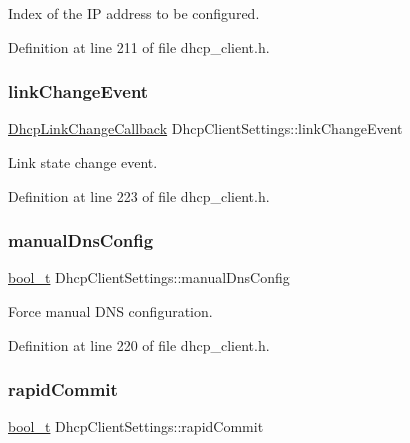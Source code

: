 Index of the IP address to be configured. 



Definition at line 211 of file dhcp\+\_\+client.\+h.

\mbox{\label{structDhcpClientSettings_a4bdc4bcc6332d448cee3df568ce7b514}} 
\subsubsection{\texorpdfstring{link\+Change\+Event}{linkChangeEvent}}
{\footnotesize\ttfamily \hyperlink{dhcp__client_8h_a008d4a3a83cb2d68f003bd9668f7e2c7}{Dhcp\+Link\+Change\+Callback} Dhcp\+Client\+Settings\+::link\+Change\+Event}



Link state change event. 



Definition at line 223 of file dhcp\+\_\+client.\+h.

\mbox{\label{structDhcpClientSettings_a3e36da043ea469f06c40e0ad0ede8929}} 
\subsubsection{\texorpdfstring{manual\+Dns\+Config}{manualDnsConfig}}
{\footnotesize\ttfamily \hyperlink{compiler__port_8h_a812d16e5494522586b3784e55d479912}{bool\+\_\+t} Dhcp\+Client\+Settings\+::manual\+Dns\+Config}



Force manual D\+NS configuration. 



Definition at line 220 of file dhcp\+\_\+client.\+h.

\mbox{\label{structDhcpClientSettings_a824a4ad21fbf02c2011db3e572e73d8c}} 
\subsubsection{\texorpdfstring{rapid\+Commit}{rapidCommit}}
{\footnotesize\ttfamily \hyperlink{compiler__port_8h_a812d16e5494522586b3784e55d479912}{bool\+\_\+t} Dhcp\+Client\+Settings\+::rapid\+Commit}



